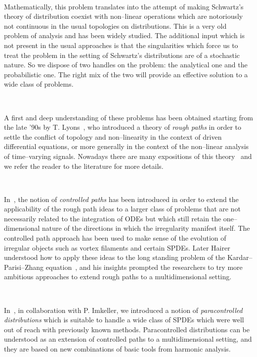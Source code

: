 \documentclass[a4paper,11pt]{article}
\newcommand{\tmem}[1]{{\em #1\/}}
\begin{document}
\

Mathematically, this problem translates into the attempt of making Schwartz's
theory of distribution coexist with non--linear operations which are
notoriously not continuous in the usual topologies on distributions. This is a
very old problem of analysis and has been widely studied. The additional input
which is not present in the usual approaches is that the singularities which
force us to treat the problem in the setting of Schwartz's distributions are
of a stochastic nature. So we dispose of two handles on the problem: the
analytical one and the probabilistic one. The right mix of the two will
provide an effective solution to a wide class of problems.

\

A first and deep understanding of these problems has been obtained starting
from the late '90s by T. Lyons~{\cite{Lyons1998}}, who introduced a theory of
{\tmem{rough paths}} in order to settle the conflict of topology and
non--linearity in the context of driven differential equations, or more
generally in the context of the non--linear analysis of time--varying signals.
Nowadays there are many expositions of this
theory~{\cite{Lyons2002,Friz2010,Lyons2007,Friz2014}} and we refer the reader
to the literature for more details.

\

In~{\cite{Gubinelli2004,Gubinelli2010}}, the notion of {\tmem{controlled
paths}} has been introduced in order to extend the applicability of the rough
path ideas to a larger class of problems that are not necessarily related to
the integration of ODEs but which still retain the one--dimensional nature of
the directions in which the irregularity manifest itself. The controlled path
approach has been used to make sense of the evolution of irregular objects
such as vortex filaments and certain SPDEs. Later Hairer understood how to
apply these ideas to the long standing problem of the Kardar--Parisi--Zhang
equation~{\cite{Hairer2013b}}, and his insights prompted the researchers to
try more ambitious approaches to extend rough paths to a multidimensional
setting.

\

In~{\cite{Gubinelli2012}}, in collaboration with P. Imkeller, we introduced a
notion of {\tmem{paracontrolled distributions}} which is suitable to
handle a wide class of SPDEs which were well out of reach with previously
known methods. Paracontrolled distributions can be understood as an extension
of controlled paths to a multidimensional setting, and they are based on new
combinations of basic tools from harmonic analysis.
\end{document}
